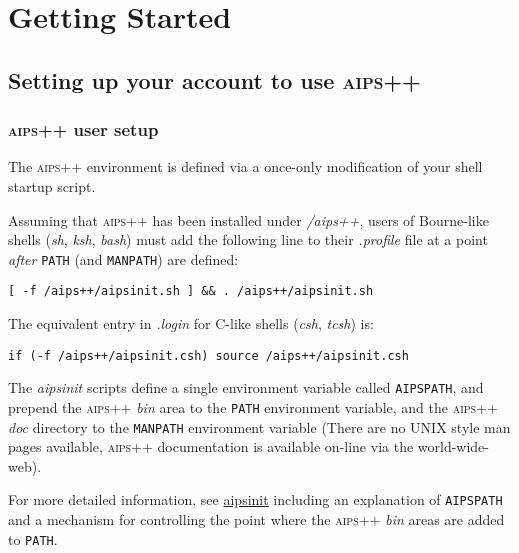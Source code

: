 \chapter{Getting Started \label{HowTo.GettingStarted}}
\section{Setting up your account to use \textsc{aips++}}
\label{Users}
\subsection{\textsc{aips++} user setup}

The \textsc{aips++} environment is defined via a once-only modification of your
shell startup script.

Assuming that \textsc{aips++} has been installed under \textsl{/aips++}, users of
Bourne-like shells (\textit{sh}, \textit{ksh}, \textit{bash}) must add the following line to
their \textsl{.profile} file at a point \emph{after} \texttt{PATH} (and
\texttt{MANPATH}) are defined:

\begin{verbatim}
[ -f /aips++/aipsinit.sh ] && . /aips++/aipsinit.sh
\end{verbatim}

\noindent
The equivalent entry in \textsl{.login} for C-like shells (\textit{csh}, \textit{tcsh})
is:

\begin{verbatim}
if (-f /aips++/aipsinit.csh) source /aips++/aipsinit.csh
\end{verbatim}

The \textit{aipsinit} scripts define a single environment variable called
\texttt{AIPSPATH}, and prepend the \textsc{aips++} \textsl{bin} area to the
\texttt{PATH} environment variable, and the \textsc{aips++} \textsl{doc} directory to
the \texttt{MANPATH} environment variable (There are no UNIX style man pages
available, \textsc{aips++} documentation is available on-line via the
world-wide-web).

For more detailed information, see \hyperref{aipsinit}{aipsinit(see AIPS++ System Manual, Section }{for more details)}{aipsinit}
including an explanation of \texttt{AIPSPATH} and a mechanism
for controlling the point where the \textsc{aips++} \textsl{bin} areas are added to
\texttt{PATH}.



\label{Programmers}
